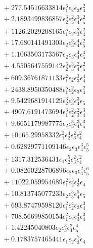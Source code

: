 \documentclass[10pt]{article}
\begin{document}
\begin{align*}
&{}  + 277.54516633814 \epsilon_{1}^{6} \epsilon_{2} \epsilon_{3} \epsilon_{4}^{2} \\
&{}  + 2.1893499836857 \epsilon_{2}^{3} \epsilon_{3}^{2} \epsilon_{4}^{3} \epsilon_{5}^{2} \\
&{}  + 1126.2029208165 \epsilon_{1}^{5} \epsilon_{2} \epsilon_{3}^{2} \epsilon_{4}^{2} \\
&{}  + 17.680141491303 \epsilon_{2} \epsilon_{3}^{3} \epsilon_{4}^{4} \epsilon_{5}^{2} \\
&{}  + 1.1063503173567 \epsilon_{2} \epsilon_{3} \epsilon_{4}^{4} \epsilon_{5}^{4} \\
&{}  + 4.5505647559142 \epsilon_{2}^{3} \epsilon_{3}^{3} \epsilon_{4}^{2} \epsilon_{5}^{2} \\
&{}  + 609.36761871133 \epsilon_{1}^{2} \epsilon_{2} \epsilon_{3}^{3} \epsilon_{4}^{4} \\
&{}  + 2438.8950350488 \epsilon_{1}^{5} \epsilon_{2}^{2} \epsilon_{3} \epsilon_{4}^{2} \\
&{}  + 9.5429681914129 \epsilon_{2}^{3} \epsilon_{3}^{3} \epsilon_{4}^{3} \epsilon_{5} \\
&{}  + 4907.6191473694 \epsilon_{1}^{3} \epsilon_{2}^{2} \epsilon_{3}^{2} \epsilon_{4}^{3} \\
&{}  + 9.6651179987775 \epsilon_{2} \epsilon_{3}^{3} \epsilon_{4}^{3} \epsilon_{5}^{3} \\
&{}  + 10165.29958332 \epsilon_{1}^{2} \epsilon_{2}^{4} \epsilon_{3}^{2} \epsilon_{4}^{2} \\
&{}  + 0.62829771109146 \epsilon_{2} \epsilon_{3} \epsilon_{4}^{3} \epsilon_{5}^{5} \\
&{}  + 1317.312536431 \epsilon_{1} \epsilon_{2}^{5} \epsilon_{3}^{2} \epsilon_{4}^{2} \\
&{}  + 0.08260228706896 \epsilon_{2} \epsilon_{3} \epsilon_{4}^{2} \epsilon_{5}^{6} \\
&{}  + 11022.059954689 \epsilon_{1}^{2} \epsilon_{2}^{3} \epsilon_{3}^{4} \epsilon_{4} \\
&{}  + 10.813745077233 \epsilon_{2} \epsilon_{3}^{3} \epsilon_{4}^{5} \epsilon_{5} \\
&{}  + 693.87479598126 \epsilon_{1}^{2} \epsilon_{2}^{4} \epsilon_{3} \epsilon_{4}^{3} \\
&{}  + 708.56699850154 \epsilon_{1}^{2} \epsilon_{2} \epsilon_{3}^{4} \epsilon_{4}^{3} \\
&{}  + 1.42245040803 \epsilon_{2} \epsilon_{3}^{3} \epsilon_{4}^{2} \epsilon_{5}^{4} \\
&{}  + 0.1783757465441 \epsilon_{1} \epsilon_{2} \epsilon_{3}^{7} \epsilon_{4} \\

\end{align*}
\end{document}
